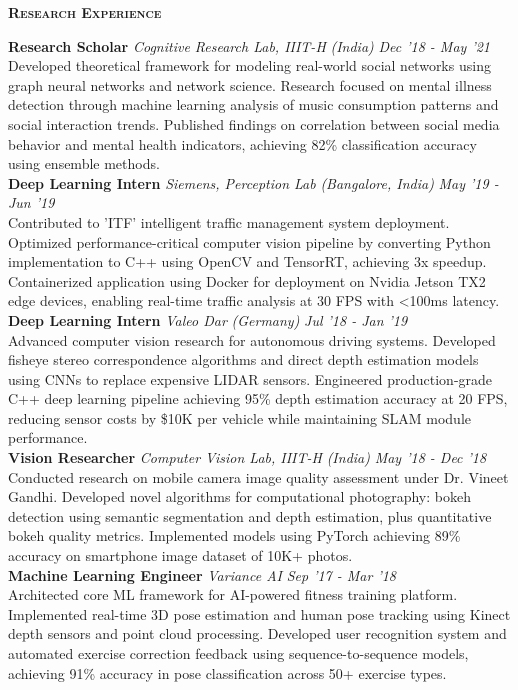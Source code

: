\documentclass[10pt]{article}
\newcommand{\headerwidth}{7.45in}
\newenvironment{changemargin}[2]{%
  \begin{list}{}{%
    \setlength{\topsep}{0pt}%
    \setlength{\leftmargin}{#1}%
    \setlength{\rightmargin}{#2}%
    \setlength{\listparindent}{\parindent}%
    \setlength{\itemindent}{\parindent}%
    \setlength{\parsep}{\parskip}%
  }%
  \item[]}{\end{list}
}
\newcommand{\header}[1]{
	\begin{changemargin}{-0.75in}{-0.75in}
    \begin{tcolorbox}[colframe=mycolor,boxrule=0.0pt,arc=0pt,
      left=6pt,right=6pt,top=6pt,bottom=6pt,boxsep=0pt,width=\headerwidth]
		\scshape{\textbf{#1}}
\end{tcolorbox}
	\end{changemargin}
}
\newenvironment{body} {
	\vspace*{-16pt}
	\begin{changemargin}{-0.6in}{-0.65in}
  }
	{\end{changemargin}
}
\begin{document}
\smallskip
\header{Research Experience}
\begin{body}
	\vspace{10pt}
    \textbf{Research Scholar} \emph{Cognitive Research Lab, IIIT-H} \emph{(India)} \hfill \emph{Dec '18 - May '21}\\
    Developed theoretical framework for modeling real-world social networks using graph neural networks and network science. Research focused on mental illness detection through machine learning analysis of music consumption patterns and social interaction trends. Published findings on correlation between social media behavior and mental health indicators, achieving 82\% classification accuracy using ensemble methods.\\
    \smallskip{}
    \textbf{Deep Learning Intern} \emph{Siemens, Perception Lab} \emph{(Bangalore, India)} \hfill \emph{May '19 - Jun '19}\\
    Contributed to 'ITF' intelligent traffic management system deployment. Optimized performance-critical computer vision pipeline by converting Python implementation to C++ using OpenCV and TensorRT, achieving 3x speedup. Containerized application using Docker for deployment on Nvidia Jetson TX2 edge devices, enabling real-time traffic analysis at 30 FPS with \textless{}100ms latency.\\
    \smallskip{}
    \textbf{Deep Learning Intern} \emph{Valeo Dar} \emph{(Germany)} \hfill \emph{Jul '18 - Jan '19}\\
    Advanced computer vision research for autonomous driving systems. Developed fisheye stereo correspondence algorithms and direct depth estimation models using CNNs to replace expensive LIDAR sensors. Engineered production-grade C++ deep learning pipeline achieving 95\% depth estimation accuracy at 20 FPS, reducing sensor costs by \$10K per vehicle while maintaining SLAM module performance.\\
    \smallskip{}
    \textbf{Vision Researcher} \emph{Computer Vision Lab, IIIT-H} \emph{(India)} \hfill \emph{May '18 - Dec '18}\\
    Conducted research on mobile camera image quality assessment under Dr. Vineet Gandhi. Developed novel algorithms for computational photography: bokeh detection using semantic segmentation and depth estimation, plus quantitative bokeh quality metrics. Implemented models using PyTorch achieving 89\% accuracy on smartphone image dataset of 10K+ photos.\\
    \smallskip{}
    \textbf{Machine Learning Engineer} \emph{Variance AI} \hfill \emph{Sep '17 - Mar '18}\\
    Architected core ML framework for AI-powered fitness training platform. Implemented real-time 3D pose estimation and human pose tracking using Kinect depth sensors and point cloud processing. Developed user recognition system and automated exercise correction feedback using sequence-to-sequence models, achieving 91\% accuracy in pose classification across 50+ exercise types.\\
    \smallskip{}
\end{body}
\end{document}

